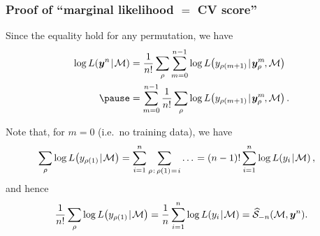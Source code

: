 \documentclass[18pt]{beamer}
\newcommand{\defineTightSpacing}{%
	\setlength{\abovedisplayskip}{.25\baselineskip}%
	\setlength{\belowdisplayskip}{.25\baselineskip}%
}
\newcommand{\given}{\thinnerspace | \thinnerspace}
\newcommand{\spacedEq}{\mkern 1mu = \mkern 1.5mu}
\newcommand{\thinnerspace}{\mskip.5\thinmuskip}
\newcommand{\negthinnerspace}{\mskip-.5\thinmuskip}
\newcommand{\likelihood}{L}
\newcommand{\by}{\bm{y}}
\newcommand{\score}{\mathcal{S}}
\newcommand{\modelSymbol}{\mathcal{M}}
\newcommand{\permutation}{\rho}
\newcommand{\trainingSize}{m}
\newcommand{\testSampleIndex}{i}
\begin{document}
\begin{frame}
\frametitle{Proof of ``marginal likelihood $=$ {\large CV} score''}
Since the equality hold for any permutation, we have
\begin{equation*} \defineTightSpacing%
\begin{aligned}
\log \likelihood(\by^n \given \modelSymbol)
	&= \frac{1}{n!} \sum_\permutation \sum_{\trainingSize = 0}^{n - 1} \log \likelihood\!\left(y_{\permutation(\trainingSize + 1)} \given \by_\permutation^\trainingSize\negthinnerspace, \modelSymbol \right) \\
	\pause
	&= \sum_{\trainingSize = 0}^{n - 1} \frac{1}{n!} \sum_\permutation  \log \likelihood\!\left(y_{\permutation(\trainingSize + 1)} \given \by_\permutation^\trainingSize\negthinnerspace, \modelSymbol \right).
\end{aligned}
\end{equation*}

\pause
Note that, for $\trainingSize = 0$ (i.e.\ no training data), we have 
\begin{equation*} \defineTightSpacing%
\begin{aligned}
\sum_\permutation \log \likelihood\!\left(y_{\permutation(1)} \given \modelSymbol \right)
	= \sum_{\testSampleIndex = 1}^n \sum_{\permutation \thinnerspace : \, \permutation(1) \spacedEq i} \ldots \thinnerspace
	&= (n - 1)! \sum_{\testSampleIndex = 1}^n \log \likelihood\!\left(y_\testSampleIndex \given \modelSymbol \right),
\end{aligned}
\end{equation*}
\pause
and hence
\begin{equation*} \defineTightSpacing%
\frac{1}{n!} \sum_\permutation \log \likelihood\!\left(y_{\permutation(1)} \given \modelSymbol \right)
	= \frac{1}{n} \sum_{\testSampleIndex = 1}^n \log \likelihood\!\left(y_\testSampleIndex \given \modelSymbol \right)
	= \widehat{\score}_{-n}(\modelSymbol, \by^n).
\end{equation*}
\end{frame}
\end{document}
